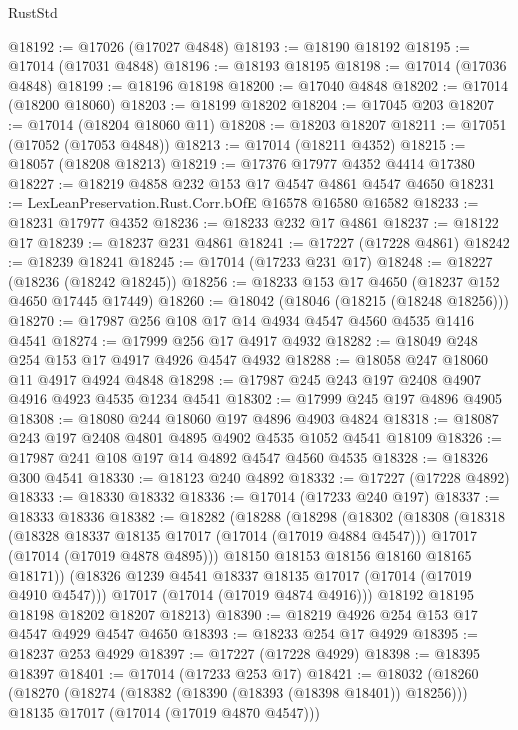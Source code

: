 \begin{lexlean}{RustStd}
\begin{coremodule}
@18192 := @17026 (@17027 @4848)
@18193 := @18190 @18192
@18195 := @17014 (@17031 @4848)
@18196 := @18193 @18195
@18198 := @17014 (@17036 @4848)
@18199 := @18196 @18198
@18200 := @17040 @4848
@18202 := @17014 (@18200 @18060)
@18203 := @18199 @18202
@18204 := @17045 @203
@18207 := @17014 (@18204 @18060 @11)
@18208 := @18203 @18207
@18211 := @17051 (@17052 (@17053 @4848))
@18213 := @17014 (@18211 @4352)
@18215 := @18057 (@18208 @18213)
@18219 := @17376 @17977 @4352 @4414 @17380
@18227 := @18219 @4858 @232 @153 @17 @4547 @4861 @4547 @4650
@18231 := LexLeanPreservation.Rust.Corr.bOfE @16578 @16580 @16582
@18233 := @18231 @17977 @4352
@18236 := @18233 @232 @17 @4861
@18237 := @18122 @17
@18239 := @18237 @231 @4861
@18241 := @17227 (@17228 @4861)
@18242 := @18239 @18241
@18245 := @17014 (@17233 @231 @17)
@18248 := @18227 (@18236 (@18242 @18245))
@18256 := @18233 @153 @17 @4650 (@18237 @152 @4650 @17445 @17449)
@18260 := @18042 (@18046 (@18215 (@18248 @18256)))
@18270 := @17987 @256 @108 @17 @14 @4934 @4547 @4560 @4535 @1416 @4541
@18274 := @17999 @256 @17 @4917 @4932
@18282 := @18049 @248 @254 @153 @17 @4917 @4926 @4547 @4932
@18288 := @18058 @247 @18060 @11 @4917 @4924 @4848
@18298 := @17987 @245 @243 @197 @2408 @4907 @4916 @4923 @4535 @1234 @4541
@18302 := @17999 @245 @197 @4896 @4905
@18308 := @18080 @244 @18060 @197 @4896 @4903 @4824
@18318 := @18087 @243 @197 @2408 @4801 @4895 @4902 @4535 @1052 @4541 @18109
@18326 := @17987 @241 @108 @197 @14 @4892 @4547 @4560 @4535
@18328 := @18326 @300 @4541
@18330 := @18123 @240 @4892
@18332 := @17227 (@17228 @4892)
@18333 := @18330 @18332
@18336 := @17014 (@17233 @240 @197)
@18337 := @18333 @18336
@18382 := @18282
    (@18288
      (@18298
        (@18302
          (@18308
            (@18318
              (@18328 @18337 @18135 @17017 (@17014 (@17019 @4884 @4547)))
              @17017
              (@17014 (@17019 @4878 @4895)))
            @18150
            @18153
            @18156
            @18160
            @18165
            @18171))
        (@18326 @1239 @4541 @18337 @18135 @17017 (@17014 (@17019 @4910 @4547)))
        @17017
        (@17014 (@17019 @4874 @4916)))
      @18192
      @18195
      @18198
      @18202
      @18207
      @18213)
@18390 := @18219 @4926 @254 @153 @17 @4547 @4929 @4547 @4650
@18393 := @18233 @254 @17 @4929
@18395 := @18237 @253 @4929
@18397 := @17227 (@17228 @4929)
@18398 := @18395 @18397
@18401 := @17014 (@17233 @253 @17)
@18421 := @18032
    (@18260
      (@18270
        (@18274 (@18382 (@18390 (@18393 (@18398 @18401)) @18256)))
        @18135
        @17017
        (@17014 (@17019 @4870 @4547)))

\end{coremodule}
\end{lexlean}
